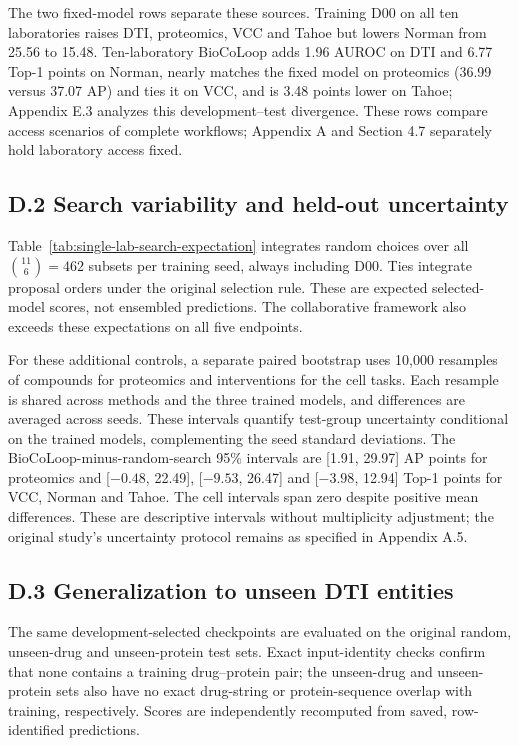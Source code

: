 The two fixed-model rows separate these sources. Training D00 on all ten laboratories raises DTI, proteomics, VCC and Tahoe but lowers Norman from 25.56 to 15.48. Ten-laboratory BioCoLoop adds 1.96 AUROC on DTI and 6.77 Top-1 points on Norman, nearly matches the fixed model on proteomics (36.99 versus 37.07 AP) and ties it on VCC, and is 3.48 points lower on Tahoe; Appendix E.3 analyzes this development--test divergence. These rows compare access scenarios of complete workflows; Appendix A and Section 4.7 separately hold laboratory access fixed.

\subsection*{D.2 Search variability and held-out uncertainty}
Table~\ref{tab:single-lab-search-expectation} integrates random choices over all $\binom{11}{6}=462$ subsets per training seed, always including D00. Ties integrate proposal orders under the original selection rule. These are expected selected-model scores, not ensembled predictions. The collaborative framework also exceeds these expectations on all five endpoints.



For these additional controls, a separate paired bootstrap uses 10,000 resamples of compounds for proteomics and interventions for the cell tasks. Each resample is shared across methods and the three trained models, and differences are averaged across seeds. These intervals quantify test-group uncertainty conditional on the trained models, complementing the seed standard deviations. The BioCoLoop-minus-random-search 95\% intervals are [1.91, 29.97] AP points for proteomics and [$-0.48$, 22.49], [$-9.53$, 26.47] and [$-3.98$, 12.94] Top-1 points for VCC, Norman and Tahoe. The cell intervals span zero despite positive mean differences. These are descriptive intervals without multiplicity adjustment; the original study's uncertainty protocol remains as specified in Appendix A.5.

\subsection*{D.3 Generalization to unseen DTI entities}
The same development-selected checkpoints are evaluated on the original random, unseen-drug and unseen-protein test sets. Exact input-identity checks confirm that none contains a training drug--protein pair; the unseen-drug and unseen-protein sets also have no exact drug-string or protein-sequence overlap with training, respectively. Scores are independently recomputed from saved, row-identified predictions.

